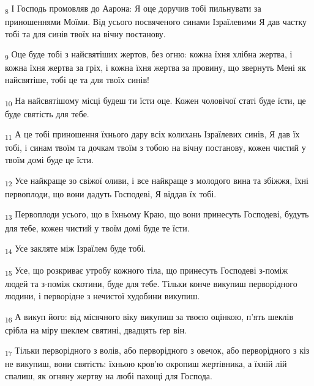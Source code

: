 \begin{tcolorbox}
\textsubscript{8} І Господь промовляв до Аарона: Я оце доручив тобі пильнувати за приношеннями Моїми. Від усього посвяченого синами Ізраїлевими Я дав частку тобі та для синів твоїх на вічну постанову.
\end{tcolorbox}
\begin{tcolorbox}
\textsubscript{9} Оце буде тобі з найсвятіших жертов, без огню: кожна їхня хлібна жертва, і кожна їхня жертва за гріх, і кожна їхня жертва за провину, що звернуть Мені як найсвятіше, тобі це та для твоїх синів!
\end{tcolorbox}
\begin{tcolorbox}
\textsubscript{10} На найсвятішому місці будеш ти їсти оце. Кожен чоловічої статі буде їсти, це буде святість для тебе.
\end{tcolorbox}
\begin{tcolorbox}
\textsubscript{11} А це тобі приношення їхнього дару всіх колихань Ізраїлевих синів, Я дав їх тобі, і синам твоїм та дочкам твоїм з тобою на вічну постанову, кожен чистий у твоїм домі буде це їсти.
\end{tcolorbox}
\begin{tcolorbox}
\textsubscript{12} Усе найкраще зо свіжої оливи, і все найкраще з молодого вина та збіжжя, їхні первоплоди, що вони дадуть Господеві, Я віддав їх тобі.
\end{tcolorbox}
\begin{tcolorbox}
\textsubscript{13} Первоплоди усього, що в їхньому Краю, що вони принесуть Господеві, будуть для тебе, кожен чистий у твоїм домі буде те їсти.
\end{tcolorbox}
\begin{tcolorbox}
\textsubscript{14} Усе закляте між Ізраїлем буде тобі.
\end{tcolorbox}
\begin{tcolorbox}
\textsubscript{15} Усе, що розкриває утробу кожного тіла, що принесуть Господеві з-поміж людей та з-поміж скотини, буде для тебе. Тільки конче викупиш перворідного людини, і перворідне з нечистої худобини викупиш.
\end{tcolorbox}
\begin{tcolorbox}
\textsubscript{16} А викуп його: від місячного віку викупиш за твоєю оцінкою, п'ять шеклів срібла на міру шеклем святині, двадцять ґер він.
\end{tcolorbox}
\begin{tcolorbox}
\textsubscript{17} Тільки перворідного з волів, або перворідного з овечок, або перворідного з кіз не викупиш, вони святість: їхньою кров'ю окропиш жертівника, а їхній лій спалиш, як огняну жертву на любі пахощі для Господа.
\end{tcolorbox}
